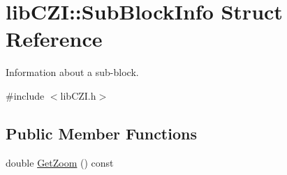 \hypertarget{structlib_c_z_i_1_1_sub_block_info}{}\section{lib\+C\+ZI\+:\+:Sub\+Block\+Info Struct Reference}
\label{structlib_c_z_i_1_1_sub_block_info}


Information about a sub-\/block.  




{\ttfamily \#include $<$lib\+C\+Z\+I.\+h$>$}

\subsection*{Public Member Functions}
\begin{DoxyCompactItemize}
\item 
double \hyperlink{structlib_c_z_i_1_1_sub_block_info_ad39548c987b6e8d80730eb29c252dfef}{Get\+Zoom} () const
\end{DoxyCompactItemize}
